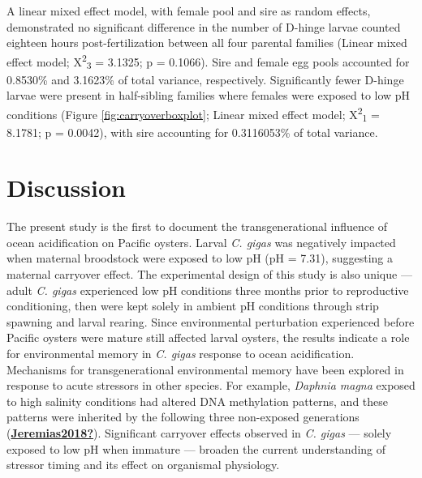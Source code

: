 \documentclass [11pt, proquest] {uwthesis}[2015/03/03]
\begin{document}
A linear mixed effect model, with female pool and sire as random effects, demonstrated no significant difference in the number of D-hinge larvae counted eighteen hours post-fertilization between all four parental families (Linear mixed effect model; X\textsuperscript{2}\textsubscript{3} = 3.1325; p = 0.1066). Sire and female egg pools accounted for 0.8530\% and 3.1623\% of total variance, respectively. Significantly fewer D-hinge larvae were present in half-sibling families where females were exposed to low pH conditions (Figure \ref{fig:carryoverboxplot}; Linear mixed effect model; X\textsuperscript{2}\textsubscript{1} = 8.1781; p = 0.0042), with sire accounting for 0.3116053\% of total variance.

\hypertarget{discussion-1}{%
\section{Discussion}\label{discussion-1}}

The present study is the first to document the transgenerational influence of ocean acidification on Pacific oysters. Larval \emph{C. gigas} was negatively impacted when maternal broodstock were exposed to low pH (pH = 7.31), suggesting a maternal carryover effect. The experimental design of this study is also unique --- adult \emph{C. gigas} experienced low pH conditions three months prior to reproductive conditioning, then were kept solely in ambient pH conditions through strip spawning and larval rearing. Since environmental perturbation experienced before Pacific oysters were mature still affected larval oysters, the results indicate a role for environmental memory in \emph{C. gigas} response to ocean acidification. Mechanisms for transgenerational environmental memory have been explored in response to acute stressors in other species. For example, \emph{Daphnia magna} exposed to high salinity conditions had altered DNA methylation patterns, and these patterns were inherited by the following three non-exposed generations (\protect\hyperlink{ref-Jeremias2018}{\textbf{Jeremias2018?}}). Significant carryover effects observed in \emph{C. gigas} --- solely exposed to low pH when immature --- broaden the current understanding of stressor timing and its effect on organismal physiology.
\end{document}
